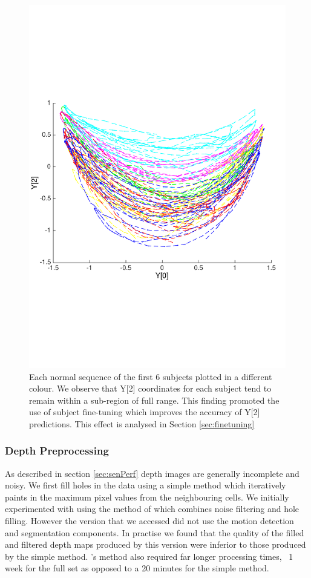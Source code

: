 \documentclass[11pt]{article} %
\begin{document}
\begin{figure}
\centering
\includegraphics*[trim={0 5cm 0 7cm},clip,width=0.75\linewidth,clip]{subjectsOnManifold.pdf} 
\caption{Each normal sequence of the first 6 subjects plotted in a different colour. We observe that Y[2] coordinates for each subject tend to remain within a sub-region of full range. This finding promoted the use of subject fine-tuning which improves the accuracy of Y[2] predictions. This effect is analysed in Section \ref{sec:finetuning} }
\label{fig:subjectsOnManifold}
\end{figure}













\subsubsection{Depth Preprocessing}
\label{sec:depthprec}
As described in section \ref{sec:senPerf} depth images are generally incomplete and noisy. We first fill holes in the data using a simple method which iteratively paints in the maximum pixel values from the neighbouring cells. We initially experimented with using the method of \cite{Camplani2012a} which combines noise filtering and hole filling. However the version that we accessed did not use the motion detection and segmentation components. In practise we found that the quality of the filled and filtered depth maps produced by this version were inferior to those produced by the simple method.  \cite{Camplani2012a}'s method also required far longer processing times, ~1 week for the full set as opposed to a 20 minutes for the simple method. 
\end{document}
